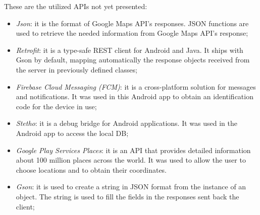 These are the utilized APIs not yet presented:
\begin{itemize}
\item \textit{Json}: it is the format of Google Maps API's responses. JSON functions are used to retrieve the needed information from Google Maps API's response;
\item \textit{Retrofit}: it is a type-safe REST client for Android and Java. It ships with Gson by default, mapping automatically the response objects received from the server in previously defined classes;
\item \textit{Firebase Cloud Messaging (FCM)}: it is a cross-platform solution for messages and notifications. It was used in this Android app to obtain an identification code for the device in use;
\item \textit{Stetho}: it is a debug bridge for Android applications. It was used in the Android app to access the local DB;
\item \textit{Google Play Services Places}: it is an API that provides detailed information about 100 million places across the world. It was used to allow the user to choose locations and to obtain their coordinates.
\item \textit{Gson}: it is used to create a string in JSON format from the instance of an object. The string is used to fill the fields in the responses sent back the client;
\end{itemize}